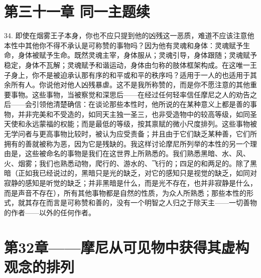 
\section{第三十一章 同一主题续}

34. 即使在烟雾王子本身，你也不应只提到他的凶残这一恶质，难道不应该注意他本性中其他你不得不承认是可称赞的事物吗？因为他有灵魂和身体：灵魂赋予生命，身体被赋予生命。既然灵魂主宰，身体服从；灵魂引导，身体跟随；灵魂赋予稳定，身体不瓦解；灵魂赋予和谐运动，身体由匀称的肢体框架构成。在这唯一王子身上，你不是被迫承认那有序的和平或和平的秩序吗？适用于一人的也适用于其余所有人。你说他对他人凶残暴虐。这不是我所称赞的，而是你不愿注意的其他重要事物。这些事物，当被察觉和深思后——在经过任何轻率信任摩尼之人的劝告之后——会引领他清楚确信：在谈论那些本性时，他所说的在某种意义上都是善的事物，并非完美和不受造的，如同天主独一圣三，也非受造物中的较高等级，如同圣天使和永远蒙福的权能；而是最低的等级，按其禀赋的微小尺度排列。这些事物被无学问者与更高事物比较时，被认为应受责备；并且由于它们缺乏某种善，它们所拥有的善就被称为恶，因为它是残缺的。我这样讨论摩尼所列举的本性的另一个理由是，这些被命名的事物是我们在这世界上所熟悉的。我们熟悉黑暗、水、风、火、烟雾；我们也熟悉动物，爬行的、游水的、飞行的；四足的和两足的。除了黑暗（正如我已经说过的，黑暗只是光的缺乏，对它的感知只是视觉的缺乏，如同对寂静的感知是听觉的缺乏；并非黑暗是什么，而是光不存在，也并非寂静是什么，而是声音不存在），所有其他事物都是自然的性质，为众人所熟悉；那些本性的形式，就其存在而言是可称赞和善的，没有一个明智之人归之于除天主——一切善物的作者——以外的任何作者。\par


\section{第32章——摩尼从可见物中获得其虚构观念的排列}

